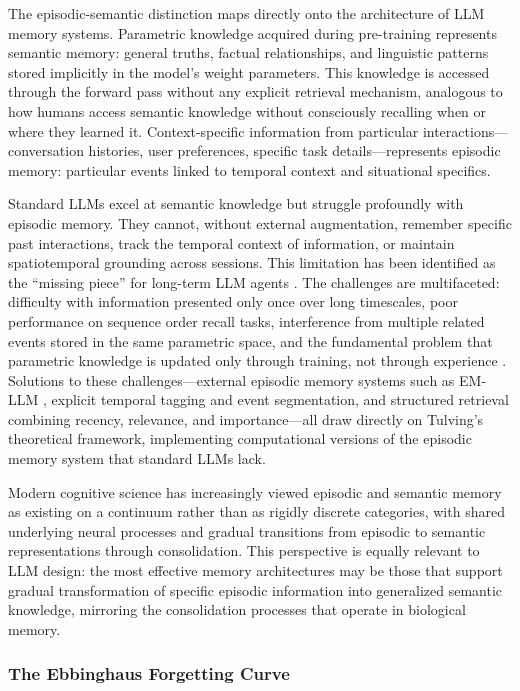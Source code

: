 The episodic-semantic distinction maps directly onto the architecture of LLM memory systems. Parametric knowledge acquired during pre-training represents semantic memory: general truths, factual relationships, and linguistic patterns stored implicitly in the model's weight parameters. This knowledge is accessed through the forward pass without any explicit retrieval mechanism, analogous to how humans access semantic knowledge without consciously recalling when or where they learned it. Context-specific information from particular interactions---conversation histories, user preferences, specific task details---represents episodic memory: particular events linked to temporal context and situational specifics.

Standard LLMs excel at semantic knowledge but struggle profoundly with episodic memory. They cannot, without external augmentation, remember specific past interactions, track the temporal context of information, or maintain spatiotemporal grounding across sessions. This limitation has been identified as the ``missing piece'' for long-term LLM agents \citep{sun2025episodic}. The challenges are multifaceted: difficulty with information presented only once over long timescales, poor performance on sequence order recall tasks, interference from multiple related events stored in the same parametric space, and the fundamental problem that parametric knowledge is updated only through training, not through experience \citep{ning2025episodic}. Solutions to these challenges---external episodic memory systems such as EM-LLM \citep{hu2025emllm}, explicit temporal tagging and event segmentation, and structured retrieval combining recency, relevance, and importance---all draw directly on Tulving's theoretical framework, implementing computational versions of the episodic memory system that standard LLMs lack.

Modern cognitive science has increasingly viewed episodic and semantic memory as existing on a continuum rather than as rigidly discrete categories, with shared underlying neural processes and gradual transitions from episodic to semantic representations through consolidation. This perspective is equally relevant to LLM design: the most effective memory architectures may be those that support gradual transformation of specific episodic information into generalized semantic knowledge, mirroring the consolidation processes that operate in biological memory.

\subsubsection{The Ebbinghaus Forgetting Curve}


